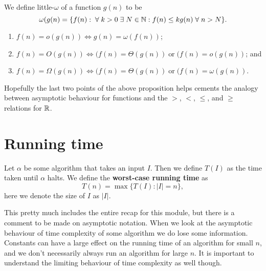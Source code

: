 \begin{definition}
    We define little-$\omega$ of a function $g(n)$ to be 
    \[ \omega(g(n) = \{ f(n) : 
        \;\forall\; k > 0 \;\exists\; N \in \mathbb{N} : f(n) \leq kg(n) \;\forall\; n > N 
        \}. 
    \]
\end{definition}

\begin{proposition}
    \begin{enumerate}
        \item $f(n) = o(g(n)) \iff g(n) = \omega(f(n))$;
        \item $f(n) = O(g(n)) \iff (f(n) = \Theta(g(n)) \;\text{or}\; (f(n) = o(g(n))$; and
        \item $f(n) = \Omega(g(n)) \iff (f(n) = \Theta(g(n)) \;\text{or}\; (f(n) = \omega(g(n))$.
    \end{enumerate}
\end{proposition}

Hopefully the last two points of the above proposition helps cements the analogy between asymptotic behaviour for functions and the $>$, $<$, $\leq$, and $\geq$ relations for $\mathbb{R}$.

\section{Running time}

\begin{definition}
    Let $\alpha$ be some algorithm that takes an input $I$. 
    Then we define $T(I)$ as the time taken until $\alpha$ halts. 
    We define the \textbf{worst-case running time} as 
    \[ T(n) = \max{\{T(I) : \lvert I \rvert = n\}}, \] 
    here we denote the size of $I$ as $\lvert I \rvert$.
\end{definition}

This pretty much includes the entire recap for this module, 
but there is a comment to be made on asymptotic notation. 
When we look at the asymptotic behaviour of time complexity of some algorithm we do lose some information. 
Constants can have a large effect on the running time of an algorithm for small $n$, 
and we don't necessarily always run an algorithm for large $n$. 
It is important to understand the limiting behaviour of time complexity as well though. 

